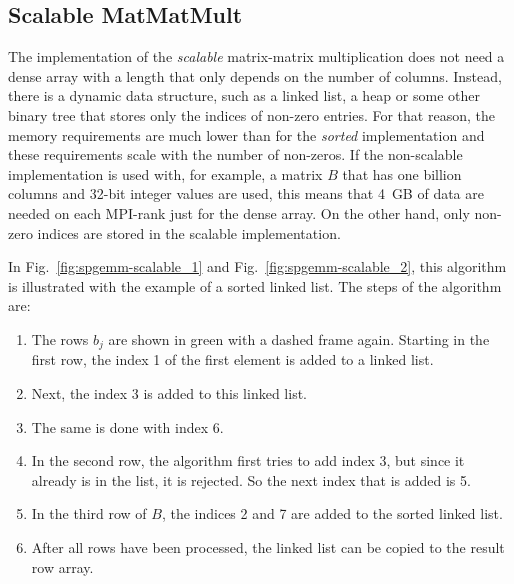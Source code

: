 \subsection{Scalable MatMatMult}
The implementation of the \textit{scalable} matrix-matrix multiplication does not need a dense array with a length that only depends on the number of columns. Instead, there is a dynamic data structure, such as a linked list, a heap or some other binary tree that stores only the indices of non-zero entries. For that reason, the memory requirements are much lower than for the \textit{sorted} implementation and these requirements scale with the number of non-zeros. If the non-scalable implementation is used with, for example, a matrix $B$ that has one billion columns and 32-bit integer values are used, this means that 4~GB of data are needed on each MPI-rank just for the dense array. On the other hand, only non-zero indices are stored in the scalable implementation.

In Fig.~\ref{fig:spgemm-scalable_1} and Fig.~\ref{fig:spgemm-scalable_2}, this algorithm is illustrated with the example of a sorted linked list. The steps of the algorithm are:

\begin{enumerate}[label=\alph*)]
\item The rows $b_j$ are shown in green with a dashed frame again. Starting in the first row, the index 1 of the first element is added to a linked list. 
\item Next, the index 3 is added to this linked list.
\item The same is done with index 6. 
\item In the second row, the algorithm first tries to add index 3, but since it already is in the list, it is rejected. So the next index that is added is 5. 
\item In the third row of $B$, the indices 2 and 7 are added to the sorted linked list.
\item After all rows have been processed, the linked list can be copied to the result row array.
\end{enumerate}


